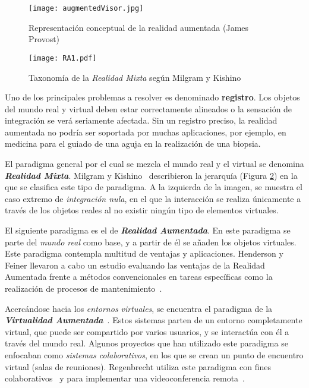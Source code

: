 \begin{figure}[h]
  \centering
  \texttt{[image: augmentedVisor.jpg]}
  \caption{Representación conceptual de la realidad aumentada (James Provost)}
  \label{fig:augmentedVisor}
\end{figure}

\begin{figure}[t] 
  \centering
  \texttt{[image: RA1.pdf]}
  \caption{Taxonomía de la \textit{Realidad Mixta} según Milgram y Kishino}
  \label{fig:RA1}
\end{figure}

Uno de los principales problemas a resolver es denominado \textbf{registro}. Los objetos del mundo real y virtual deben estar correctamente alineados o la sensación de integración se verá seriamente afectada. Sin un registro preciso, la realidad aumentada no podría ser soportada por muchas aplicaciones, por ejemplo, en medicina para el guiado de una aguja en la realización de una biopsia. 


El paradigma general por el cual se mezcla el mundo real y el virtual se denomina \textbf{\textit{Realidad Mixta}}. Milgram y Kishino~\cite{kishino1994taxonomy} describieron la jerarquía (Figura \ref{fig:RA1}) en la que se clasifica este tipo de paradigma. A la izquierda de la imagen, se muestra el caso extremo de \textit{integración nula}, en el que la interacción se realiza únicamente a través de los objetos reales al no existir ningún tipo de elementos virtuales.

El siguiente paradigma es el de \textbf{\textit{Realidad Aumentada}}. En este paradigma se parte del \textit{mundo real} como base, y a partir de él se añaden los objetos virtuales. Este paradigma contempla multitud de ventajas y aplicaciones. Henderson y Feiner llevaron a cabo un estudio evaluando las ventajas de la Realidad Aumentada frente a métodos convencionales en tareas específicas como la realización de procesos de mantenimiento~\cite{henderson2009evaluating}. %

Acercándose hacia los \textit{entornos virtuales}, se encuentra el paradigma de la \textbf{\textit{Virtualidad Aumentada}}~\cite{neumann2009modeling}. Estos sistemas parten de un entorno completamente virtual, que puede ser compartido por varios usuarios, y se interactúa con él a través del mundo real. Algunos proyectos que han utilizado este paradigma se enfocaban como \textit{sistemas colaborativos}, en los que se crean un punto de encuentro virtual (salas de reuniones).  Regenbrecht utiliza este paradigma con fines colaborativos~\cite{regenbrecht2004using} y para implementar una videoconferencia remota~\cite{regenbrecht2003augmented}.

